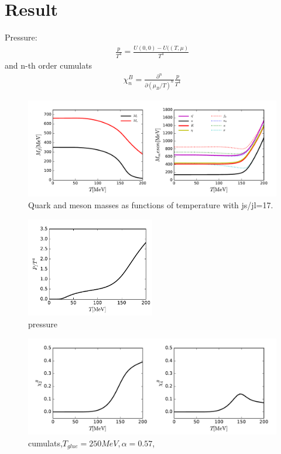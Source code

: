 \documentclass[12pt]{article}
\begin{document}
\section{Result}
Pressure:
\begin{align}
\frac{p}{T^4}=\frac{U(0,0)-U((T,\mu)}{T^4}
\end{align}
and  n-th order cumulats
\begin{align}
\chi^B_n=\frac{\partial^n}{\partial (\mu_B/T)^n}\frac{p}{T^4}
\end{align}
\begin{figure}[t]
\includegraphics[width=1.\textwidth]{MFMBO}
\caption{Quark and meson masses as functions of temperature with js/jl=17.}
\end{figure}
\begin{figure}[t]
\includegraphics[width=0.5\textwidth]{PT4}
\caption{pressure}
\end{figure}
\begin{figure}[t]
\includegraphics[width=1.\textwidth]{chi24}
\caption{cumulats,$T_{glue}=250MeV,\alpha=0.57$,}
\end{figure}
\end{document}

